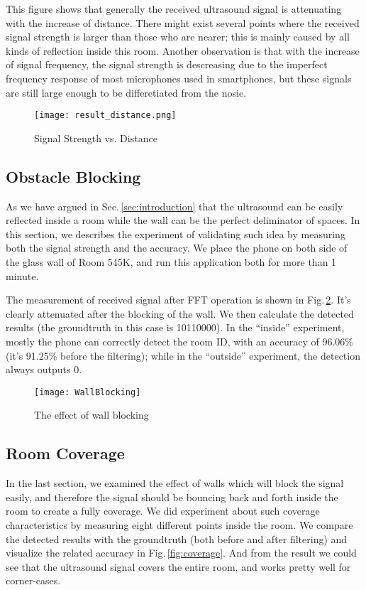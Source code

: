 This figure shows that generally the received ultrasound signal is attenuating with the increase of distance. There might exist several points where the received signal strength is larger than those who are nearer; this is mainly caused by all kinds of reflection inside this room. Another observation is that with the increase of signal frequency, the signal strength is descreasing due to the imperfect frequency response of most microphones used in smartphones, but these signals are still large enough to be differetiated from the nosie.

\begin{figure}
  \centering
  \texttt{[image: result\_distance.png]}
  \caption{Signal Strength vs. Distance}
  \vspace{-0.3cm}
  \label{fig:strength}
\end{figure}

\subsection{Obstacle Blocking}
\label{sec:obstacle-blocking}
As we have argued in Sec.\,\ref{sec:introduction} that the ultrasound can be easily reflected inside a room while the wall can be the perfect deliminator of spaces. In this section, we describes the experiment of validating such idea by measuring both the signal strength and the accuracy. We place the phone on both side of the glass wall of Room 545K, and run this application both for more than 1 minute.

The measurement of received signal after FFT operation is shown in Fig.\,\ref{fig:wallblock}. It's clearly attenuated after the blocking of the wall. We then calculate the detected results (the groundtruth in this case is 10110000). In the ``inside'' experiment, mostly the phone can correctly detect the room ID, with an accuracy of 96.06\% (it's 91.25\% before the filtering); while in the ``outside'' experiment, the detection always outputs 0.

\begin{figure}
  \centering
  \texttt{[image: WallBlocking]}
  \vspace{-0.3cm}
  \caption{The effect of wall blocking}
  \label{fig:wallblock}
\end{figure}

\subsection{Room Coverage}
\label{sec:room-coverage}
In the last section, we examined the effect of walls which will block the signal easily, and therefore the signal should be bouncing back and forth inside the room to create a fully coverage. We did experiment about such coverage characteristics by measuring eight different points inside the room. We compare the detected results with the groundtruth (both before and after filtering) and visualize the related accuracy in Fig.\,\ref{fig:coverage}. And from the result we could see that the ultrasound signal covers the entire room, and works pretty well for corner-cases. 

